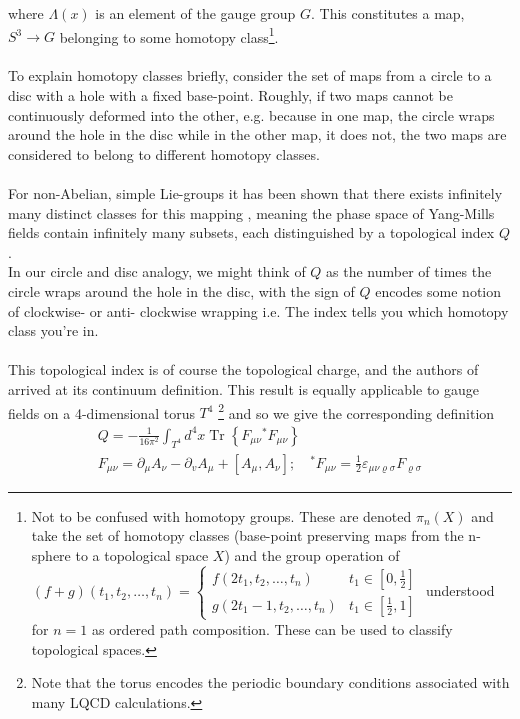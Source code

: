 \documentclass[a4paper,10pt]{article}
\begin{document}
where $\Lambda(x)$ is an element of the gauge group $G$. This constitutes a map, $S^3\rightarrow G$ belonging to some homotopy class\footnote{Not to be confused with homotopy groups. These are denoted $\pi_n(X)$ and take the set of homotopy classes (base-point preserving maps from the n-sphere to a topological space $X$) and the group operation of $(f+g)\left(t_{1}, t_{2}, \ldots, t_{n}\right)= \begin{cases}f\left(2 t_{1}, t_{2}, \ldots, t_{n}\right) & t_{1} \in\left[0, \frac{1}{2}\right] \\ g\left(2 t_{1}-1, t_{2}, \ldots, t_{n}\right) & t_{1} \in\left[\frac{1}{2}, 1\right]\end{cases}$ understood for $n=1$ as ordered path composition. These can be used to classify topological spaces.}.\\\\ To explain homotopy classes briefly, consider the set of maps from a circle to a disc with a hole with a fixed base-point. Roughly, if two maps cannot be continuously deformed into the other, e.g. because in one map, the circle wraps around the hole in the disc while in the other map, it does not, the two maps are considered to belong to different homotopy classes.\\\\ For non-Abelian, simple Lie-groups \cite{bredon1993topology} it has been shown that there exists infinitely many distinct classes for this mapping \cite{BelavinA.A1975Psot}, meaning the phase space of Yang-Mills fields contain infinitely many subsets, each distinguished by a topological index $Q$.\\In our circle and disc analogy, we might think of $Q$ as the number of times the circle wraps around the hole in the disc, with the sign of $Q$ encodes some notion of clockwise- or anti- clockwise wrapping i.e. The index tells you which homotopy class you're in.\\\\This topological index is of course the topological charge, and the authors of \cite{BelavinA.A1975Psot} arrived at its continuum definition. This result is equally applicable to gauge fields on a 4-dimensional torus $T^4$ \footnote{Note that the torus encodes the periodic boundary conditions associated with many LQCD calculations.} and so we give the corresponding definition
\begin{equation}\label{eq:topChargeCont}
\begin{gathered}
Q=-\frac{1}{16 \pi^{2}} \int_{T^{4}} d^{4} x \operatorname{Tr}\left\{F_{\mu \nu}{ }^{*} F_{\mu \nu}\right\} \\
F_{\mu \nu}=\partial_{\mu} A_{\nu}-\partial_{v} A_{\mu}+\left[A_{\mu}, A_{\nu}\right] ; \quad ^* F_{\mu \nu}=\frac{1}{2} \varepsilon_{\mu \nu \varrho \sigma} F_{\varrho \sigma}
\end{gathered}
\end{equation}
\end{document}
